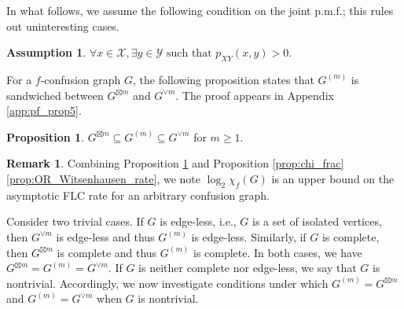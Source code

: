 \documentclass[journal, onecolumn, draftcls]{IEEEtran}
\theoremstyle{definition}
\newtheorem{assumption}{Assumption}
\newtheorem{proposition}{Proposition}
\newtheorem{remark}{Remark}
\newcommand{\calX}{\mathcal{X}}
\newcommand{\calY}{\mathcal{Y}}
\newcommand{\meng}[1]{\marginpar{+}{\bf Ruoyu's remark}: {\em #1}}
\newcommand{\aditya}[1]{\marginpar{+}{\bf Aditya's remark}: {\em #1}}
\begin{document}
In what follows, we assume the following condition on the joint p.m.f.; this rules out uninteresting cases.
\begin{assumption}\label{assume:irreducible}
    $\forall x \in \calX, \exists y\in \calY\text{ such that  }p_{XY}(x,y)>0.$
\end{assumption} 
For a $f$-confusion graph $G$, the following proposition states that $G^{(m)}$ is sandwiched between $G^{\boxtimes m}$ and $G^{\lor m}$. The proof appears in Appendix \ref{app:pf_prop5}.
\begin{proposition}\label{prop:AND_power_m-instance_graph_OR_power}
  $G^{\boxtimes m} \subseteq G^{(m)} \subseteq G^{\lor m}$ for $m\ge 1$.
\end{proposition}
\begin{remark}
Combining Proposition \ref{prop:AND_power_m-instance_graph_OR_power}  and Proposition \ref{prop:chi_frac} \ref{prop:OR_Witsenhausen_rate}, we note  $\log_2\chi_f(G)$ is an upper bound on the asymptotic FLC rate for an arbitrary confusion graph. %
%
\end{remark}
Consider two trivial cases. If $G$ is edge-less, i.e., $G$ is a set of isolated vertices, then $G^{\lor m}$ is edge-less and thus $G^{( m)}$ is edge-less. Similarly, if $G$ is complete, then $G^{\boxtimes m}$ is complete and thus $G^{( m)}$ is complete. In both cases, we have $G^{\boxtimes m}= G^{(m)}=G^{\lor m}$.  If $G$ is neither complete nor edge-less, we say that $G$ is nontrivial. Accordingly, we now investigate conditions under which $G^{(m)} = G^{\boxtimes m}$ and $G^{(m)} = G^{\lor m}$ when $G$ is nontrivial.
\end{document}

